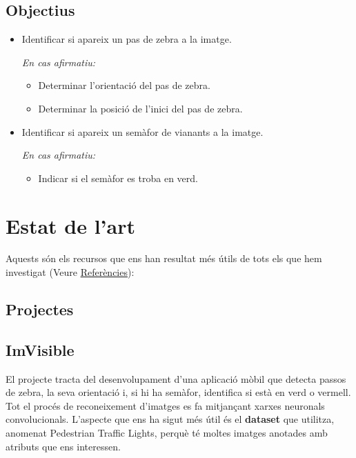 \documentclass[10pt,a4paper,twocolumn,twoside]{article}
\begin{document}
\subsection{Objectius}
\vspace{-0.3em}
\begin{itemize}
	\item Identificar si apareix un pas de zebra a la imatge.
	
	\vspace{0.3em}
	\textit{En cas afirmatiu:}
	\begin{itemize}[label=\textbullet]
		\item {Determinar l’orientació del pas de zebra.}
		\item {Determinar la posició de l'inici del pas de zebra.}
	\end{itemize}
	\item {Identificar si apareix un semàfor de vianants a la imatge.}
	
	\vspace{0.3em}
	\textit{En cas afirmatiu:}
	\begin{itemize}[label=\textbullet]
		\item {Indicar si el semàfor es troba en verd.}
	\end{itemize}
\end{itemize}

\section{Estat de l'art}
Aquests són els recursos que ens han resultat més útils de tots els que hem investigat (Veure \hyperref[sec:biblio]{Referències}):

\subsection{Projectes}\label{sec:projectes}
\subsection*{ImVisible \cite{ImVisible}}
El projecte tracta del desenvolupament d'una aplicació mòbil que detecta passos de zebra, la seva orientació i, si hi ha semàfor, identifica si està en verd o vermell. Tot el procés de reconeixement d'imatges es fa mitjançant xarxes neuronals convolucionals. L'aspecte que ens ha sigut més útil és el \textbf{dataset} que utilitza, anomenat Pedestrian Traffic Lights, perquè té moltes imatges anotades amb atributs que ens interessen.
\end{document}

